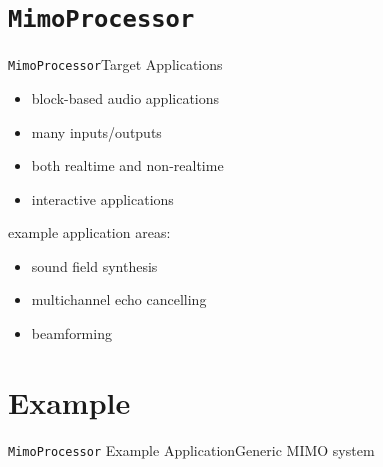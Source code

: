 \documentclass{beamer}
\newcommand{\code}{\texttt}
\newcommand{\distance}{1.2em}
\begin{document}
\section{\code{MimoProcessor}}

\begin{frame}{\code{MimoProcessor}}{Target Applications}
\begin{itemize}
\item block-based audio applications
\item many inputs/outputs
\item both realtime and non-realtime
\item interactive applications
\end{itemize}
\vfill
\pause
example application areas:
\begin{itemize}
\item sound field synthesis
\item multichannel echo cancelling
\item beamforming
\end{itemize}
\end{frame}

\def\fork#1{
\path[fork] node[point] (fork#1) {}
[sibling distance=4.5ex,every child node/.style=box]
child foreach \number in {1,...,4} {node (h-#1-\number) {$h_{#1,\number}(t)$}}
node [left=of fork#1,nobox] (input#1) {input #1} edge[noarrow] (fork#1);
}

\section{Example}

\begin{frame}{\code{MimoProcessor} Example Application}{Generic MIMO system}

\def\shift{-19ex}

\begin{center}
\end{center}
\end{frame}
\end{document}
